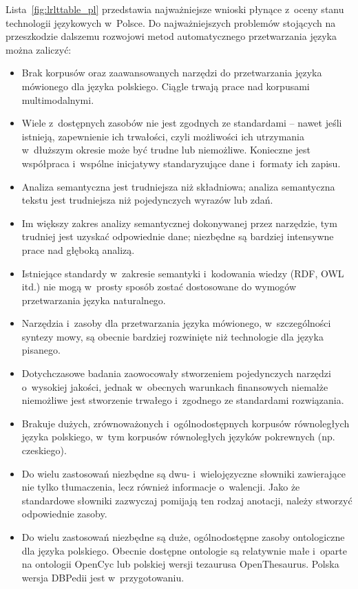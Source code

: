\begin{multicols}{2}
Lista~\ref{fig:lrlttable_pl} przedstawia najważniejsze wnioski
płynące z~oceny stanu technologii językowych w~Polsce. Do
najważniejszych problemów stojących na przeszkodzie dalszemu
rozwojowi metod automatycznego przetwarzania języka można zaliczyć: 

\begin{itemize} \item Brak korpusów oraz zaawansowanych narzędzi do
przetwarzania języka mówionego dla języka polskiego. Ciągle
trwają prace nad korpusami multimodalnymi. \item Wiele z~dostępnych
zasobów nie jest zgodnych ze standardami – nawet jeśli istnieją,
zapewnienie ich trwałości, czyli możliwości ich utrzymania
w~dłuższym okresie może być trudne lub niemożliwe. Konieczne jest
współpraca i~wspólne inicjatywy standaryzujące dane i~formaty ich
zapisu. \item Analiza semantyczna jest trudniejsza niż składniowa;
analiza semantyczna tekstu jest trudniejsza niż pojedynczych wyrazów
lub zdań. \item Im większy zakres analizy semantycznej dokonywanej
przez narzędzie, tym trudniej jest uzyskać odpowiednie dane;
niezbędne są bardziej intensywne prace nad głęboką analizą.
\item Istniejące standardy w~zakresie semantyki i~kodowania wiedzy
(RDF, OWL itd.) nie mogą w~prosty sposób zostać dostosowane do
wymogów przetwarzania języka naturalnego. \item Narzędzia i~zasoby
dla przetwarzania języka mówionego, w~szczególności syntezy mowy,
są obecnie bardziej rozwinięte niż technologie dla języka
pisanego. \item Dotychczasowe badania zaowocowały stworzeniem
pojedynczych narzędzi o~wysokiej jakości, jednak w~obecnych
warunkach finansowych niemalże niemożliwe jest stworzenie trwałego
i~zgodnego ze standardami rozwiązania. \end{itemize} 

\begin{itemize} \item Brakuje dużych, zrównoważonych
i~ogólnodostępnych korpusów równoległych języka polskiego, w~tym
korpusów równoległych języków pokrewnych (np. czeskiego). \item
Do wielu zastosowań niezbędne są dwu- i~wielojęzyczne słowniki
zawierające nie tylko tłumaczenia, lecz również informacje
o~walencji. Jako że standardowe słowniki zazwyczaj pomijają ten
rodzaj anotacji, należy stworzyć odpowiednie zasoby. \item Do wielu
zastosowań niezbędne są duże, ogólnodostępne zasoby ontologiczne
dla języka polskiego. Obecnie dostępne ontologie są relatywnie
małe i~oparte na ontologii OpenCyc lub polskiej wersji tezaurusa
OpenThesaurus. Polska wersja DBPedii jest w~przygotowaniu.
\end{itemize} 


\end{multicols}

